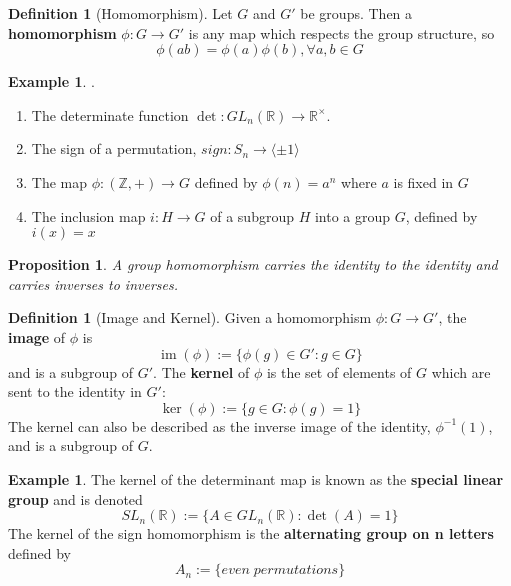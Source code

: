 \documentclass[12pt]{article}
\newtheorem{prop}[thm]{Proposition}
\theoremstyle{definition}
\newtheorem{defn}[thm]{Definition}
\newtheorem{eg}[thm]{Example}
\theoremstyle{remark}
\numberwithin{equation}{section}
\newcommand\R{\mathbb R}    %
\newcommand\Z{\mathbb Z}    %
\newcommand\B[1]{\textbf{ #1}}
\DeclareMathOperator{\im}{im}
\begin{document}
\begin{defn}[Homomorphism]
        Let $G$ and $G'$ be groups. Then a \B{homomorphism} $\phi:G\rightarrow G'$ is any map which respects the group structure, so \begin{equation}
                \phi(ab)=\phi(a)\phi(b),\forall a,b\in G
        \end{equation}
\end{defn}
\begin{eg}
        .\newline \begin{enumerate}
                \item The determinate function $\det:GL_n(\R) \rightarrow \R^{\times}$.
                \item The sign of a permutation, $sign:S_n \rightarrow \langle \pm 1\rangle$
                \item The map $\phi:(\Z,+)\rightarrow G$ defined by $\phi(n) = a^n$ where $a$ is fixed in $G$
                \item The inclusion map $i:H\rightarrow G$ of a subgroup $H$ into a group $G$, defined by $i(x) = x$
        \end{enumerate}
\end{eg}


\vspace{15pt}


\begin{prop}
        A group homomorphism carries the identity to the identity and carries inverses to inverses.
\end{prop}


\vspace{15pt}

\begin{defn}[Image and Kernel]
        Given a homomorphism $\phi:G\rightarrow G'$, the \B{image} of $\phi$ is \begin{equation}
                \im(\phi):= \{\phi(g) \in G':g\in G\}
        \end{equation}
        and is a subgroup of $G'$. The \B{kernel} of $\phi$ is the set of elements of $G$ which are sent to the identity in $G'$: \begin{equation}
                \ker(\phi) := \{g \in G: \phi(g) = 1\}
        \end{equation}
        The kernel can also be described as the inverse image of the identity, $\phi^{-1}(1)$, and is a subgroup of $G$.
\end{defn}
\begin{eg}
        The kernel of the determinant map is known as the \B{special linear group} and is denoted \begin{equation}
                SL_n(\R) := \{A \in GL_n(\R):\det(A) = 1\}
        \end{equation}
        The kernel of the sign homomorphism is the \B{alternating group on n letters} defined by \begin{equation}
                A_n := \{even\;permutations\}
        \end{equation}
\end{eg}
\end{document}
